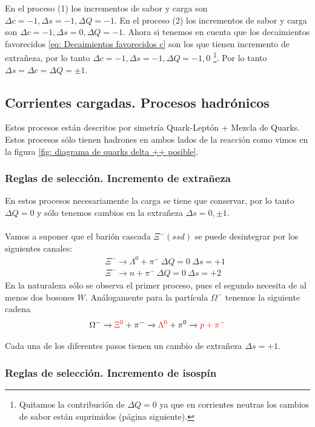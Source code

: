 En el proceso (1) los incrementos de sabor y carga son $\Delta c=-1,\Delta s=-1, \Delta Q=-1$. En el proceso (2) los incrementos de sabor y carga son $\Delta c=-1,\Delta s=0, \Delta Q=-1$. Ahora si tenemos en cuenta que los decaimientos favorecidos \ref{eq: Decaimientos favorecidos c} son los que tienen incremento de extrañeza, por lo tanto $\Delta c=-1, \Delta s=-1, \Delta Q=-1,0$ \footnote{Quitamos la contribución de $\Delta Q=0$ ya que en corrientes neutras los cambios de sabor están suprimidos (página siguiente).}. Por lo tanto $\boxed{\Delta s=\Delta c=\Delta Q=\pm 1}$.
\subsection{Corrientes cargadas. Procesos hadrónicos}
Estos procesos están descritos por simetría Quark-Leptón + Mezcla de Quarks. Estos procesos sólo tienen hadrones en ambos lados de la reacción como vimos en la figura \ref{fig: diagrama de quarks delta ++ posible}.
\subsubsection{Reglas de selección. Incremento de extrañeza}
En estos procesos necesariamente la carga se tiene que conservar, por lo tanto $\Delta Q=0$ y sólo tenemos cambios en la extrañeza $\Delta s=0,\pm1$.\\\\
Vamos a suponer que el barión cascada $\Xi^- (ssd)$ se puede desintegrar por los siguientes canales:
\begin{equation*}
    \begin{aligned}
        &\quad \Xi^- \longrightarrow \Lambda^0+\pi^- \ \Delta Q=0 \ \Delta s=+1 \\
        &\quad \Xi^- \longrightarrow n+\pi^- \ \Delta Q=0 \ \Delta s=+2
    \end{aligned}
\end{equation*}
En la naturaleza sólo se observa el primer proceso, pues el segundo necesita de al menos dos bosones $W$. Análogamente para la partícula $\Omega^-$ tenemos la siguiente cadena
$$\Omega^-\xrightarrow[]{} \textcolor{red}{\Xi^0}+\pi^- \xrightarrow[]{} \textcolor{red}{\Lambda^0}+\pi^0 \xrightarrow[]{} \textcolor{red}{p+\pi^-}$$

\noindent Cada una de los diferentes pasos tienen un cambio de extrañeza $\Delta s=+1$.
\subsubsection{Reglas de selección. Incremento de isospín}


